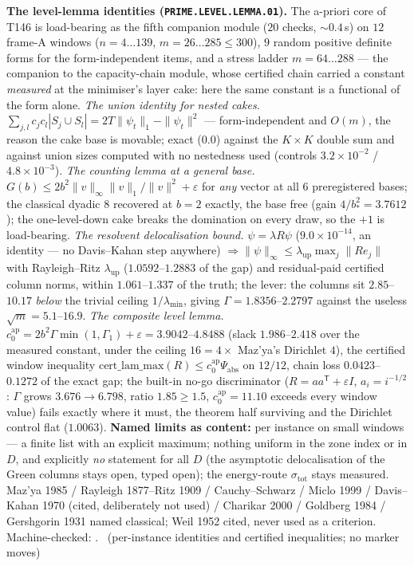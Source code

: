 \documentclass[11pt,a4paper]{article}
\theoremstyle{definition}
\begin{document}
\par\smallskip\noindent\textbf{The level-lemma identities
(\texttt{PRIME.LEVEL.LEMMA.01}).}
The a-priori core of T146 is load-bearing as the fifth companion module ($20$
checks, ${\sim}0.4$\,s) on $12$ frame-A windows ($n=4\ldots139$,
$m=26\ldots285\le300$), $9$ random positive definite forms for the
form-independent items, and a stress ladder $m=64\ldots288$ --- the companion
to the capacity-chain module, whose certified chain carried a constant
\emph{measured} at the minimiser's layer cake: here the same constant is a
functional of the form alone.
\emph{The union identity for nested cakes.}
$\sum_{j,l}c_jc_l|S_j\cup S_l|=2T\|\psi_t\|_1-\|\psi_t\|^2$ --- form-independent
and $O(m)$, the reason the cake base is movable; exact ($0.0$) against the
$K\times K$ double sum and against union sizes computed with no nestedness
used (controls $3.2\times10^{-2}$ / $4.8\times10^{-3}$).
\emph{The counting lemma at a general base.}
$G(b)\le2b^2\|v\|_\infty\|v\|_1/\|v\|^2+\varepsilon$ for \emph{any} vector at
all $6$ preregistered bases; the classical dyadic $8$ recovered at $b=2$
exactly, the base free (gain $4/b_*^2=3.7612$); the one-level-down cake breaks
the domination on every draw, so the $+1$ is load-bearing.
\emph{The resolvent delocalisation bound.} $\psi=\lambda R\psi$
($9.0\times10^{-14}$, an identity --- no Davis--Kahan step anywhere)
$\Rightarrow\|\psi\|_\infty\le\lambda_{\mathrm{up}}\max_j\|Re_j\|$ with
Rayleigh--Ritz $\lambda_{\mathrm{up}}$ ($1.0592$--$1.2883$ of the gap) and
residual-paid certified column norms, within $1.061$--$1.337$ of the truth;
the lever: the columns sit $2.85$--$10.17$ \emph{below} the trivial ceiling
$1/\lambda_{\min}$, giving $\Gamma=1.8356$--$2.2797$ against the useless
$\sqrt m=5.1$--$16.9$.
\emph{The composite level lemma.}
$c_0^{\mathrm{ap}}=2b^2\Gamma\min(1,\Gamma_1)+\varepsilon=3.9042$--$4.8488$
(slack $1.986$--$2.418$ over the measured constant, under the ceiling
$16=4\times$ Maz'ya's Dirichlet $4$), the certified window inequality
$\mathrm{cert\_lam\_max}(R)\le c_0^{\mathrm{ap}}\Psi_{\mathrm{abs}}$ on
$12/12$, chain loss $0.0423$--$0.1272$ of the exact gap; the built-in no-go
discriminator ($R=aa^{\mathsf T}+\varepsilon I$, $a_i=i^{-1/2}$: $\Gamma$
grows $3.676\to6.798$, ratio $1.85\ge1.5$, $c_0^{\mathrm{ap}}=11.10$ exceeds
every window value) fails exactly where it must, the theorem half surviving
and the Dirichlet control flat ($1.0063$).
\textbf{Named limits as content:} per instance on small windows --- a finite
list with an explicit maximum; nothing uniform in the zone index or in $D$,
and explicitly \emph{no} statement for all $D$ (the asymptotic delocalisation
of the Green columns stays open, typed open); the energy-route
$\sigma_{\mathrm{tot}}$ stays measured.
Maz'ya 1985 / Rayleigh 1877--Ritz 1909 / Cauchy--Schwarz / Miclo 1999 /
Davis--Kahan 1970 (cited, deliberately not used) / Charikar 2000 / Goldberg
1984 / Gershgorin 1931 named classical; Weil 1952 cited, never used as a
criterion.
Machine-checked:
.
\mE\ (per-instance identities and certified inequalities; no marker moves)
\end{document}
